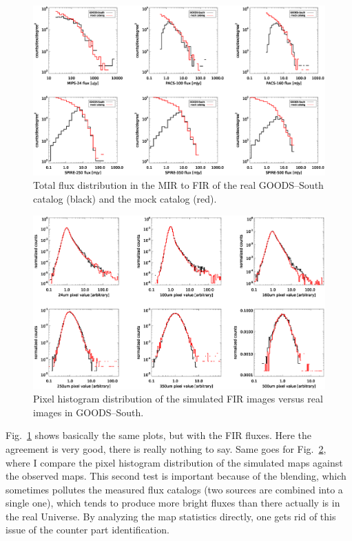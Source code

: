 \documentclass[12pt,a4paper]{article}
\newcommand{\rfig}[1]{Fig.~\ref{#1}}
\begin{document}
\begin{figure}
\includegraphics[width=\textwidth]{ir_flux}
\caption{\label{FIG:irflux} Total flux distribution in the MIR to FIR of the real GOODS--South catalog (black) and the mock catalog (red).}
\end{figure}
\begin{figure}
\includegraphics[width=\textwidth]{ir_pd}
\caption{\label{FIG:irpd} Pixel histogram distribution of the simulated FIR images versus real images in GOODS--South.}
\end{figure}

\rfig{FIG:irflux} shows basically the same plots, but with the FIR fluxes. Here the agreement is very good, there is really nothing to say. Same goes for \rfig{FIG:irpd}, where I compare the pixel histogram distribution of the simulated maps against the observed maps. This second test is important because of the blending, which sometimes pollutes the measured flux catalogs (two sources are combined into a single one), which tends to produce more bright fluxes than there actually is in the real Universe. By analyzing the map statistics directly, one gets rid of this issue of the counter part identification.
\end{document}
